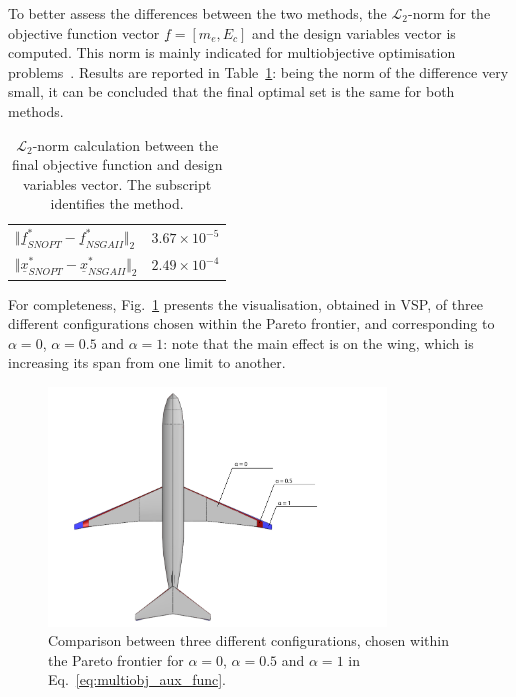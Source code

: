 To better assess the differences between the two methods, the $\mathcal{L}_2$-norm for the objective function vector $\underline{f}=[m_e, E_c]$ and the design variables vector is computed.
This norm is mainly indicated for multiobjective optimisation problems~\cite{bib:giagkiozis}.
Results are reported in Table~\ref{tab:hybrid_dep_pareto_norm_l2}: being the norm of the difference very small, it can be concluded that the final optimal set is the same for both methods. 
\begin{table}[!h]
	\centering
	\begin{tabular}{l c}
		\hline
		$\Vert\underline{f}^{*}_{SNOPT} - \underline{f}^{*}_{NSGAII}\Vert_2$ & $3.67\times10^{-5}$ \\
		$\Vert\underline{x}^{*}_{SNOPT} - \underline{x}^{*}_{NSGAII}\Vert_2$ & $2.49\times10^{-4}$ \\
		\hline
	\end{tabular}
	\caption{$\mathcal{L}_2$-norm calculation between the final objective function and design variables vector. The subscript identifies the method.}
	\label{tab:hybrid_dep_pareto_norm_l2}
\end{table}

For completeness, Fig.~\ref{fig:hybrid_dep_pareto_aircraft_render_comparison} presents the visualisation, obtained in VSP, of three different configurations chosen within the Pareto frontier, and corresponding to $\alpha=0$, $\alpha=0.5$ and $\alpha=1$: note that the main effect is on the wing, which is increasing its span from one limit to another. 
\begin{figure}[!h]
	\centering
	\includegraphics[keepaspectratio, width=0.8\textwidth]{images/chap3/hybrid_dep_pareto_render_comp}
	\caption{Comparison between three different configurations, chosen within the Pareto frontier for $\alpha=0$, $\alpha=0.5$ and $\alpha=1$ in Eq.~\eqref{eq:multiobj_aux_func}.}
	\label{fig:hybrid_dep_pareto_aircraft_render_comparison}
\end{figure}

